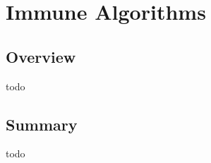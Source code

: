 


\chapter{Immune Algorithms}
\label{ch:immune}

\section{Overview}
todo

\newpage
\newpage
\newpage
\newpage
\newpage
\newpage

\section{Summary}
todo
